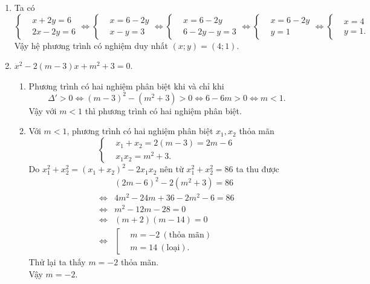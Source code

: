\begin{ex}
{\begin{enumerate}
	\item Ta có $$\left\lbrace \begin{aligned} &x+2y=6\\ &2x-2y=6 \end{aligned} \right. \Leftrightarrow \left\lbrace \begin{aligned} &x=6-2y\\ &x-y=3 \end{aligned} \right. \Leftrightarrow\left\lbrace\begin{aligned} &x=6-2y\\ &6-2y-y=3\end{aligned} \right. \Leftrightarrow\left\lbrace \begin{aligned} &x=6-2y\\ &y=1 \end{aligned} \right. \Leftrightarrow \left\lbrace \begin{aligned} &x=4\\ &y=1. \end{aligned} \right.$$
	Vậy hệ phương trình có nghiệm duy nhất $(x;y)=(4;1)$.
	\item $x^2-2(m-3)x+m^2+3=0$.
	\begin{enumerate}
	\item Phương trình có hai nghiệm phân biệt khi và chỉ khi 
	$$\Delta'>0\Leftrightarrow (m-3)^2-(m^2+3)>0\Leftrightarrow 6-6m>0\Leftrightarrow m<1.$$
	Vậy với $m<1$ thì phương trình có hai nghiệm phân biệt.
	\item Với $m<1$, phương trình có hai nghiệm phân biệt $x_1, x_2$ thỏa mãn $$\left\lbrace \begin{aligned} &x_1+x_2=2(m-3)=2m-6\\ &x_1x_2=m^2+3. \end{aligned} \right.$$
	Do $x_1^2+x_2^2=(x_1+x_2)^2-2x_1x_2$ nên từ $x_1^2+x_2^2=86$ ta thu được
	\begin{align*}
	&(2m-6)^2-2(m^2+3)=86\\
	\Leftrightarrow &4m^2-24m+36-2m^2-6=86\\
	\Leftrightarrow &m^2-12m-28=0\\
	\Leftrightarrow &(m+2)(m-14)=0\\
	\Leftrightarrow &\left[ \begin{aligned} &m=-2\ (\text{thỏa mãn})\\ &m=14\ (\text{loại}). \end{aligned} \right.
	\end{align*}
	Thử lại ta thấy $m=-2$ thỏa mãn.\\
	Vậy $m=-2$.
	\end{enumerate}
\end{enumerate}
}
\end{ex}

